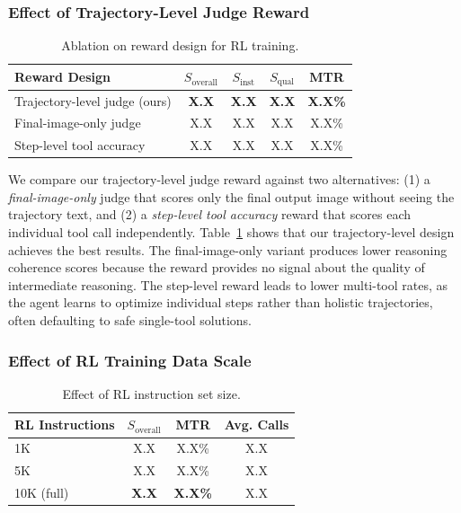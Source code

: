 \documentclass{article}
\begin{document}
\subsubsection{Effect of Trajectory-Level Judge Reward}

\begin{table}[t]
\centering
\caption{Ablation on reward design for RL training.}
\label{tab:ablation_reward}
\begin{tabular}{lcccc}
\toprule
\textbf{Reward Design} & $S_{\text{overall}}$ & $S_{\text{inst}}$ & $S_{\text{qual}}$ & MTR \\
\midrule
Trajectory-level judge (ours) & \textbf{X.X} & \textbf{X.X} & \textbf{X.X} & \textbf{X.X\%} \\
Final-image-only judge & X.X & X.X & X.X & X.X\% \\
Step-level tool accuracy & X.X & X.X & X.X & X.X\% \\
\bottomrule
\end{tabular}
\end{table}



We compare our trajectory-level judge reward against two alternatives: (1) a \textit{final-image-only} judge that scores only the final output image without seeing the trajectory text, and (2) a \textit{step-level tool accuracy} reward that scores each individual tool call independently. Table~\ref{tab:ablation_reward} shows that our trajectory-level design achieves the best results. The final-image-only variant produces lower reasoning coherence scores because the reward provides no signal about the quality of intermediate reasoning. The step-level reward leads to lower multi-tool rates, as the agent learns to optimize individual steps rather than holistic trajectories, often defaulting to safe single-tool solutions.

\subsubsection{Effect of RL Training Data Scale}

\begin{table}[t]
\centering
\caption{Effect of RL instruction set size.}
\label{tab:ablation_rl_scale}
\begin{tabular}{lccc}
\toprule
\textbf{RL Instructions} & $S_{\text{overall}}$ & MTR & Avg. Calls \\
\midrule
1K & X.X & X.X\% & X.X \\
5K & X.X & X.X\% & X.X \\
10K (full) & \textbf{X.X} & \textbf{X.X\%} & X.X \\
\bottomrule
\end{tabular}
\end{table}
\end{document}
